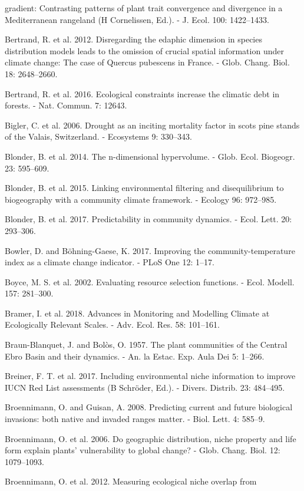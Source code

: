 \documentclass[11pt,twoside]{reedthesis}
\begin{document}
gradient: Contrasting patterns of plant trait convergence and divergence
in a Mediterranean rangeland (H Cornelissen, Ed.). - J. Ecol. 100:
1422--1433.\par
Bertrand, R. et al. 2012. Disregarding the edaphic dimension in species
distribution models leads to the omission of crucial spatial information
under climate change: The case of Quercus pubescens in France. - Glob.
Chang. Biol. 18: 2648--2660.\par
Bertrand, R. et al. 2016. Ecological constraints increase the climatic
debt in forests. - Nat. Commun. 7: 12643.\par
Bigler, C. et al. 2006. Drought as an inciting mortality factor in scots
pine stands of the Valais, Switzerland. - Ecosystems 9: 330--343.\par
Blonder, B. et al. 2014. The n-dimensional hypervolume. - Glob. Ecol.
Biogeogr. 23: 595--609.\par
Blonder, B. et al. 2015. Linking environmental filtering and
disequilibrium to biogeography with a community climate framework. -
Ecology 96: 972--985.\par
Blonder, B. et al. 2017. Predictability in community dynamics. - Ecol.
Lett. 20: 293--306.\par
Bowler, D. and Böhning-Gaese, K. 2017. Improving the
community-temperature index as a climate change indicator. - PLoS One
12: 1--17.\par
Boyce, M. S. et al. 2002. Evaluating resource selection functions. -
Ecol. Modell. 157: 281--300.\par
Bramer, I. et al. 2018. Advances in Monitoring and Modelling Climate at
Ecologically Relevant Scales. - Adv. Ecol. Res. 58: 101--161.\par
Braun-Blanquet, J. and Bolòs, O. 1957. The plant communities of the
Central Ebro Basin and their dynamics. - An. la Estac. Exp. Aula Dei 5:
1--266.\par
Breiner, F. T. et al. 2017. Including environmental niche information to
improve IUCN Red List assessments (B Schröder, Ed.). - Divers. Distrib.
23: 484--495.\par
Broennimann, O. and Guisan, A. 2008. Predicting current and future
biological invasions: both native and invaded ranges matter. - Biol.
Lett. 4: 585--9.\par
Broennimann, O. et al. 2006. Do geographic distribution, niche property
and life form explain plants' vulnerability to global change? - Glob.
Chang. Biol. 12: 1079--1093.\par
Broennimann, O. et al. 2012. Measuring ecological niche overlap from
\end{document}
